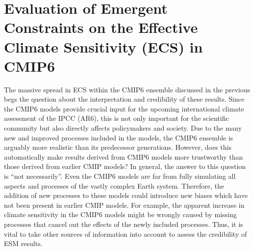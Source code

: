 
%



\chapter{Evaluation of Emergent Constraints on the Effective Climate
  Sensitivity (\acs{ECS}) in \acs{CMIP}6}
\label{ch:05:paper_ecs}

The massive spread in \ac{ECS} within the \acs{CMIP}6 ensemble discussed in the
previous  begs the question about
the interpretation and credibility of these results. Since the \acs{CMIP}6
models provide crucial input for the upcoming international climate assessment
of the \ac{IPCC} (\acs{AR}6), this is not only important for the scientific
community but also directly affects policymakers and society. Due to the many
new and improved processes included in the models, the \acs{CMIP}6 ensemble is
arguably more realistic than its predecessor generations. However, does this
automatically make results derived from \acs{CMIP}6 models more trustworthy
than those derived from earlier \ac{CMIP} models? In general, the answer to
this question is \enquote{not necessarily}. Even the \acs{CMIP}6 models are far
from fully simulating all aspects and processes of the vastly complex Earth
system. Therefore, the addition of new processes to these models could
introduce new biases which have not been present in earlier \ac{CMIP} models.
For example, the apparent increase in climate sensitivity in the \acs{CMIP}6
models might be wrongly caused by missing processes that cancel out the effects
of the newly included processes. Thus, it is vital to take other sources of
information into account to assess the credibility of \ac{ESM} results.

